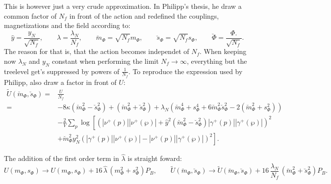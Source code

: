This is however just a very crude approximation. In Philipp's thesis, he draw a common factor of $N_f$ in front of the action and redefined the couplings,
magnetizations and the field according to:
\begin{equation}\label{eq:def_reparametrization_couplingsAndMagnetization_Nf}
 \hat y = \frac{y_N}{\sqrt{N_f}},\qquad
 \hat \lambda = \frac{\lambda_N}{N_f},\qquad
 \breve{m}_{\Phi} = \sqrt{N_f} m_{\Phi},\qquad
 \breve{s}_{\Phi} = \sqrt{N_f} s_{\Phi},\qquad 
 \breve{\Phi}=\frac{\Phi.}{\sqrt{N_f}}.
\end{equation}
The reason for that is, that the action becomes independet of $N_f$. 
When keeping now $\lambda_N$ and $y_N$ constant when performing the limit $N_f \rightarrow \infty$, everything but the treelevel get's suppressed by 
powers of $\frac{1}{N_f}$.
To reproduce the expression used by Philipp, also draw a factor in front of $U$:
\begin{align}\label{eq:CEP_treelevel_reparametrized}
 \tilde U(\breve{m}_{\Phi},\breve{s}_{\Phi}) =& \frac{U}{N_f} \nonumber \\
            =& -8 \kappa \left( \breve{m}_{\Phi}^2 - \breve{s}_{\Phi}^2 \right)   +   \left( \breve{m}_{\Phi}^2 + \breve{s}_{\Phi}^2 \right)
                         + \lambda_N \left( \breve{m}_{\Phi}^4 + s_{\Phi}^4 + 6 \breve{m}_{\Phi}^2 \breve{s}_{\Phi}^2
                         - 2 \left(\breve{m}_{\Phi}^2 + s_{\Phi}^2 \right) \right) 
                           \nonumber \\
                        & -\frac{2}{V} \sum\limits_p \log
                                    \left[ \left( |\nu^+(p)| |\nu^+(\wp)|   +
                                    \hat y ^2 \left( \breve{m}_{\Phi}^2 - \breve{s}_{\Phi}^2 \right) |\gamma^+(p)| |\gamma^+(\wp)|\right)^2 
                                    \nonumber \right. \\ 
                        & \left. +  \breve{m}_{\Phi}^2 y_N^2 \left( |\gamma^+(p)| |\nu^+(\wp)|   -   |\nu^+(p)| |\gamma^+(\wp)| \right)^2\right].
\end{align}

The addition of the first order term in $\hat \lambda$ is straight foward:
\begin{equation}\label{eq:CEP_oneLoopAddition}
 U(m_{\Phi}, s_{\Phi}) \rightarrow U(m_{\Phi}, s_{\Phi}) + 16\, \hat \lambda\, \left(m_{\Phi}^2+s_{\Phi}^2\right) P_B, \qquad 
 \tilde U(\breve{m}_{\Phi},\breve{s}_{\Phi}) \rightarrow  
       \tilde U(\breve{m}_{\Phi},\breve{s}_{\Phi}) + 16 \,\frac{\lambda_N}{N_f}\,\left( \breve{m}_{\Phi}^2 + \breve{s}_{\Phi}^2 \right) P_B.
\end{equation}





